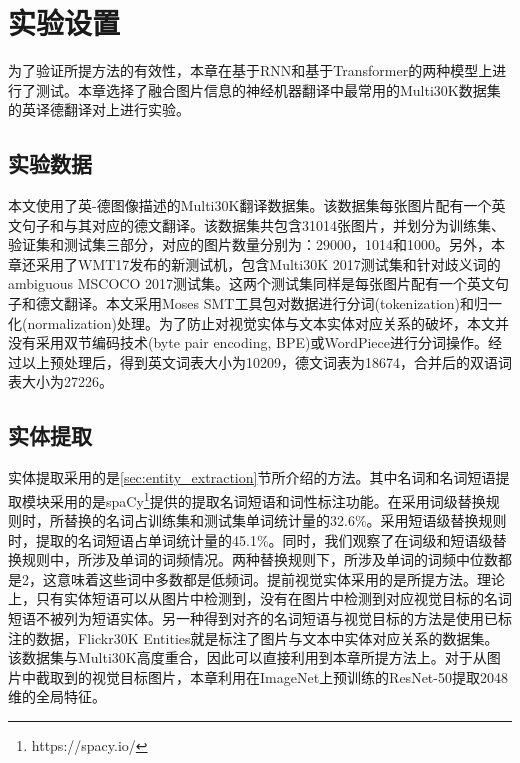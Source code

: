 \section{实验设置}
为了验证所提方法的有效性，本章在基于RNN和基于Transformer的两种模型上进行了测试。本章选择了融合图片信息的神经机器翻译中最常用的Multi30K\cite{43_elliott-etal-2016-multi30k}数据集的英译德翻译对上进行实验。

\subsection{实验数据}
本文使用了英-德图像描述的Multi30K翻译数据集。该数据集每张图片配有一个英文句子和与其对应的德文翻译。该数据集共包含31014张图片，并划分为训练集、验证集和测试集三部分，对应的图片数量分别为：29000，1014和1000。另外，本章还采用了WMT17发布的新测试机，包含Multi30K 2017测试集和针对歧义词的ambiguous MSCOCO 2017测试集。这两个测试集同样是每张图片配有一个英文句子和德文翻译。本文采用Moses SMT\cite{44_koehn-etal-2007-moses}工具包对数据进行分词(tokenization)和归一化(normalization)处理。为了防止对视觉实体与文本实体对应关系的破坏，本文并没有采用双节编码技术\cite{27_sennrich-etal-2016-neural}(byte pair encoding, BPE)或WordPiece\cite{28_DBLP:journals/corr/WuSCLNMKCGMKSJL16}进行分词操作。经过以上预处理后，得到英文词表大小为10209，德文词表为18674，合并后的双语词表大小为27226。

\subsection{实体提取}
\label{sec:3_setup_entity_extraction}
实体提取采用的是\ref{sec:entity_extraction}节所介绍的方法。其中名词和名词短语提取模块采用的是spaCy\footnote{https://spacy.io/}提供的提取名词短语和词性标注功能。在采用词级替换规则时，所替换的名词占训练集和测试集单词统计量的32.6\%。采用短语级替换规则时，提取的名词短语占单词统计量的45.1\%。同时，我们观察了在词级和短语级替换规则中，所涉及单词的词频情况。两种替换规则下，所涉及单词的词频中位数都是2，这意味着这些词中多数都是低频词。提前视觉实体采用的是\cite{24_DBLP:conf/iccv/YangGWHYL19}所提方法。理论上，只有实体短语可以从图片中检测到，没有在图片中检测到对应视觉目标的名词短语不被列为短语实体。另一种得到对齐的名词短语与视觉目标的方法是使用已标注的数据，Flickr30K Entities\cite{29_DBLP:conf/iccv/PlummerWCCHL15,30_DBLP:journals/ijcv/PlummerWCCHL17}就是标注了图片与文本中实体对应关系的数据集。该数据集与Multi30K高度重合，因此可以直接利用到本章所提方法上。对于从图片中截取到的视觉目标图片，本章利用在ImageNet\cite{31_DBLP:journals/ijcv/RussakovskyDSKS15}上预训练的ResNet-50\cite{32_DBLP:conf/cvpr/HeZRS16}提取2048维的全局特征。

